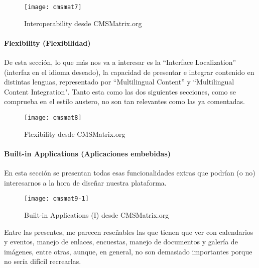 \begin{figure}
\begin{narrow}{-0.12\linewidth}{-0.12\linewidth}
\centering
\texttt{[image: cmsmat7]}
\caption{Interoperability desde CMSMatrix.org}
\end{narrow}
\label{fig:cmsmat7}
\end{figure}



\paragraph{Flexibility (Flexibilidad)}


\par De esta sección, lo que más nos va a interesar es la ``Interface Localization'' (interfaz en el idioma deseado), la capacidad de presentar e integrar contenido en distintas lenguas, representado por ``Multilingual Content'' y ``Multilingual Content Integration". Tanto esta como las dos siguientes secciones, como se comprueba en el estilo austero, no son tan relevantes como las ya comentadas.

\begin{figure}
\begin{narrow}{-0.12\linewidth}{-0.12\linewidth}
\centering
\texttt{[image: cmsmat8]}
\caption{Flexibility desde CMSMatrix.org}
\end{narrow}
\label{fig:cmsmat8}
\end{figure}


\paragraph{Built-in Applications (Aplicaciones embebidas)}


\par En esta sección se presentan todas esas funcionalidades extras que podrían (o no) interesarnos a la hora de diseñar nuestra plataforma. 

\begin{figure}
\begin{narrow}{-0.12\linewidth}{-0.12\linewidth}
\centering
\texttt{[image: cmsmat9-1]}
\caption{Built-in Applications (I) desde CMSMatrix.org}
\end{narrow}
\label{fig:cmsmat9}
\end{figure}

\par Entre las presentes, me parecen reseñables las que tienen que ver con calendarios y eventos, manejo de enlaces, encuestas, manejo de documentos y galería de imágenes, entre otras, aunque, en general, no son demasiado importantes porque no sería difícil recrearlas.

